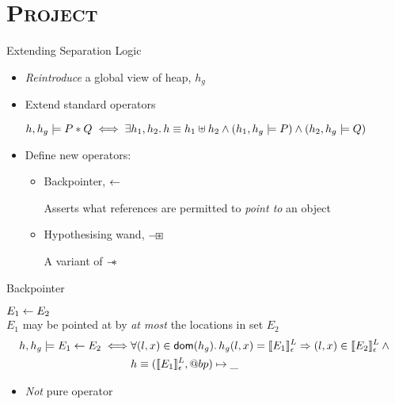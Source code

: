 \documentclass[xcolor=x11names,compress]{beamer}
\renewcommand{\(}{\begin{columns}}
\renewcommand{\)}{\end{columns}}
\newcommand{\<}[1]{\begin{column}{#1}}
\renewcommand{\>}{\end{column}}
\begin{document}
\section{\scshape Project}
\begin{frame}{Extending Separation Logic}
  \begin{itemize}
    \item \emph{Reintroduce} a global view of heap, $h_g$

    \item Extend standard operators

      {\small$
  h,h_g \models P \mathbin{*} Q \iff
    \exists h_1,h_2 \mathpunct{.} h \equiv h_1 \uplus h_2 \land
    (h_1,h_g \models P) \land (h_2,h_g \models Q)
  $}

    \item Define new operators:
      \begin{itemize}
        \item Backpointer, $\leftarrow$

          Asserts what references are permitted to \emph{point to} an object

        \item Hypothesising wand, $\mathbin{-\mkern-3mu \boxast}$

          A variant of $\mathbin{-\mkern-6mu *}$
    \end{itemize}
  \end{itemize}
\end{frame}

\begin{frame}{Backpointer}
  \begin{center}
    $E_1 \leftarrow E_2$ \\
    $E_1$ may be pointed at by \emph{at most} the locations in set $E_2$
  {\small
\begin{align*}
  h, h_g \models E_1 \leftarrow E_2 \iff &
    \forall (l,x) \in \mathsf{dom}(h_g) \mathpunct{.} h_g(l,x) = \llbracket E_1 \rrbracket^L_\epsilon
    \Rightarrow (l,x) \in \llbracket E_2 \rrbracket^L_\epsilon \land {} \\
    & h \equiv (\llbracket E_1 \rrbracket^L_\epsilon, @bp) \mapsto \_
\end{align*}
}
  \end{center}

  \begin{itemize}
    \item \emph{Not} pure operator
  \end{itemize}
  
\end{frame}
\end{document}
